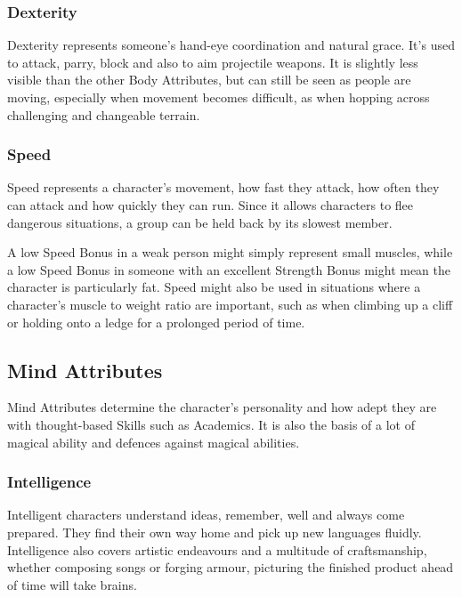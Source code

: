 \begin{multicols}{2}
\subsubsection[Dexterity]{Dexterity }

Dexterity represents someone's hand-eye coordination and natural grace.
It's used to attack, parry, block and also to aim projectile weapons.
It is slightly less visible than the other Body Attributes, but can still be seen as people are moving, especially when movement becomes difficult, as when hopping across challenging and changeable terrain.

\subsubsection[Speed]{Speed }

Speed represents a character's movement, how fast they attack, how often they can attack and how quickly they can run.
Since it allows characters to flee dangerous situations, a group can be held back by its slowest member.

A low Speed Bonus in a weak person might simply represent small muscles, while a low Speed Bonus in someone with an excellent Strength Bonus might mean the character is particularly fat.
Speed might also be used in situations where a character's muscle to weight ratio are important, such as when climbing up a cliff or holding onto a ledge for a prolonged period of time.

\subsection{Mind Attributes}

Mind Attributes determine the character's personality and how adept they are with thought-based Skills such as Academics. It is also the basis of a lot of magical ability and defences against magical abilities.

\subsubsection[Intelligence]{Intelligence }

Intelligent characters understand ideas, remember, well and always come prepared.
They find their own way home and pick up new languages fluidly.
Intelligence also covers artistic endeavours and a multitude of craftsmanship, whether composing songs or forging armour, picturing the finished product ahead of time will take brains.


\end{multicols}
